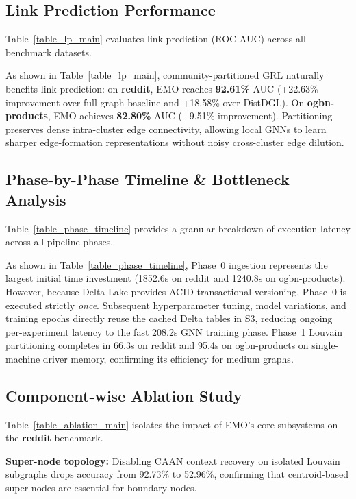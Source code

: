 \documentclass[conference,compsoc]{IEEEtran}
\begin{document}
\subsection{Link Prediction Performance}
Table~\ref{table_lp_main} evaluates link prediction (ROC-AUC) across all benchmark datasets.



As shown in Table~\ref{table_lp_main}, community-partitioned GRL naturally benefits link prediction: on \textbf{reddit}, EMO reaches \textbf{92.61\%} AUC (+22.63\% improvement over full-graph baseline and +18.58\% over DistDGL). On \textbf{ogbn-products}, EMO achieves \textbf{82.80\%} AUC (+9.51\% improvement). Partitioning preserves dense intra-cluster edge connectivity, allowing local GNNs to learn sharper edge-formation representations without noisy cross-cluster edge dilution.

\subsection{Phase-by-Phase Timeline \& Bottleneck Analysis}
Table~\ref{table_phase_timeline} provides a granular breakdown of execution latency across all pipeline phases.



As shown in Table~\ref{table_phase_timeline}, Phase~0 ingestion represents the largest initial time investment (1852.6s on reddit and 1240.8s on ogbn-products). However, because Delta Lake provides ACID transactional versioning, Phase~0 is executed strictly \emph{once}. Subsequent hyperparameter tuning, model variations, and training epochs directly reuse the cached Delta tables in S3, reducing ongoing per-experiment latency to the fast 208.2s GNN training phase. Phase~1 Louvain partitioning completes in 66.3s on reddit and 95.4s on ogbn-products on single-machine driver memory, confirming its efficiency for medium graphs.

\subsection{Component-wise Ablation Study}
Table~\ref{table_ablation_main} isolates the impact of EMO's core subsystems on the \textbf{reddit} benchmark.



\textbf{Super-node topology:} Disabling CAAN context recovery on isolated Louvain subgraphs drops accuracy from 92.73\% to 52.96\%, confirming that centroid-based super-nodes are essential for boundary nodes.
\end{document}
